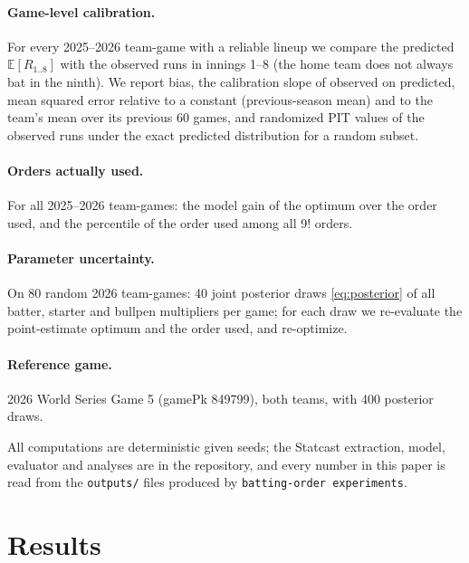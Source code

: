 \documentclass[11pt]{article}
\theoremstyle{definition}
\theoremstyle{remark}
\newcommand{\E}{\mathbb{E}}
\begin{document}
\paragraph{Game-level calibration.} For every 2025--2026 team-game with a reliable lineup we
compare the predicted $\E[R_{1..8}]$ with the observed runs in innings 1--8 (the home team does not
always bat in the ninth). We report bias, the calibration slope of observed on predicted, mean
squared error relative to a constant (previous-season mean) and to the team's mean over its
previous 60 games, and randomized PIT values \cite{czado2009} of the observed runs under the
exact predicted distribution for a random subset.

\paragraph{Orders actually used.} For all 2025--2026 team-games: the model gain of the optimum over
the order used, and the percentile of the order used among all 9! orders.

\paragraph{Parameter uncertainty.} On 80 random 2026 team-games: 40 joint posterior draws
\eqref{eq:posterior} of all batter, starter and bullpen multipliers per game; for each draw we
re-evaluate the point-estimate optimum and the order used, and re-optimize.

\paragraph{Reference game.} 2026 World Series Game 5 (gamePk 849799), both teams, with 400
posterior draws.

All computations are deterministic given seeds; the Statcast extraction, model, evaluator and
analyses are in the repository, and every number in this paper is read from the
\texttt{outputs/} files produced by \texttt{batting-order experiments}.

\section{Results}\label{sec:results}


\end{document}
